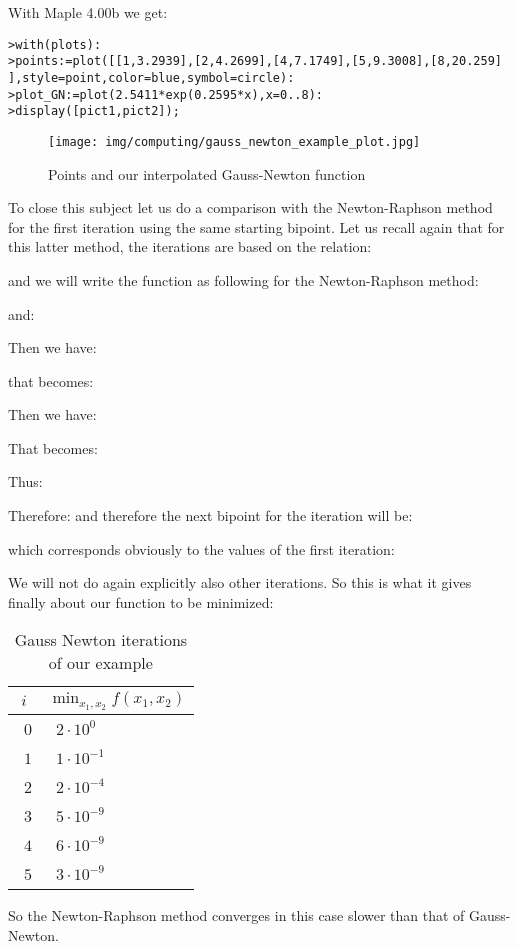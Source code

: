 	With Maple 4.00b we get:
	
	\texttt{>with(plots):}\\
	\texttt{>points:=plot([[1,3.2939],[2,4.2699],[4,7.1749],[5,9.3008],[8,20.259] ],style=point,color=blue,symbol=circle):}\\
	\texttt{>plot\_GN:=plot(2.5411*exp(0.2595*x),x=0..8):}\\	
	\texttt{>display([pict1,pict2]);}
	
	\begin{figure}[H]
		\centering
		\texttt{[image: img/computing/gauss\_newton\_example\_plot.jpg]}
		\caption[]{Points and our interpolated Gauss-Newton function}
	\end{figure}
		
	To close this subject let us do a comparison with the Newton-Raphson method for the first iteration using the same starting bipoint. Let us recall again that for this latter method, the iterations are based on the relation:
	
	and we will write the function as following for the Newton-Raphson method:
	
	and:
	
	Then we have:
	
	that becomes:
	
	Then we have:
	
	That becomes:
	
	Thus:
	
	Therefore:
	and therefore the next bipoint for the iteration will be:
	
	which corresponds obviously to the values of the first iteration:
	
	We will not do again explicitly also other iterations. So this is what it gives finally about our function to be minimized:
	\begin{table}[H]
		\begin{center}
				\begin{tabular}{|p{2cm}|p{2cm}|}
					\hline
					\multicolumn{1}{c}{\cellcolor{black!30}$i$} & 
	  \multicolumn{1}{c}{\cellcolor{black!30}$\mathop{\min}_{x_1,x_2} f(x_1,x_2)$}  \\ \hline
					\centering\arraybackslash\ $0$ & \centering\arraybackslash\ $2\cdot 10^0$ \\ \hline	
					\centering\arraybackslash\ $1$ & \centering\arraybackslash\ $1\cdot 10^{-1}$ \\ \hline	
					\centering\arraybackslash\ $2$ & \centering\arraybackslash\ $2\cdot 10^{-4}$ \\ \hline	
					\centering\arraybackslash\ $3$ & \centering\arraybackslash\ $5\cdot 10^{-9}$ \\ \hline	
					\centering\arraybackslash\ $4$ & \centering\arraybackslash\ $6\cdot 10^{-9}$ \\ \hline	
					\centering\arraybackslash\ $5$ & \centering\arraybackslash\ $3\cdot 10^{-9}$ \\ \hline	
				\end{tabular}
		\end{center}
		\caption[]{Gauss Newton iterations of our example}
	\end{table}
	So the Newton-Raphson method converges in this case slower than that of Gauss-Newton.
	
